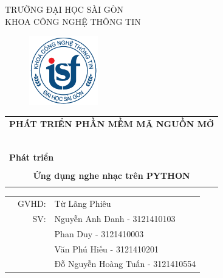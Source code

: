 \documentclass[a4paper]{article}
\begin{document}
\begin{titlepage}
	\begin{center}
		TRƯỜNG ĐẠI HỌC SÀI GÒN \\
		KHOA CÔNG NGHỆ THÔNG TIN
	\end{center}
	\vspace{1cm}

	\begin{figure}[h!]
		\begin{center}
			\includegraphics[width=3cm]{logoITSGU.png}
		\end{center}
	\end{figure}

	\vspace{1cm}


	\begin{center}
		\begin{tabular}{c}
			\multicolumn{1}{l}{\textbf{{\Large PHÁT TRIỂN PHẦN MỀM MÃ NGUỒN MỞ}}} \\
			~~                                                                    \\
			\hline
			\\
			\multicolumn{1}{l}{\textbf{{\Large Phát triển}}}                      \\
			\\

			\textbf{{\Huge Ứng dụng nghe nhạc trên PYTHON}}                       \\
			\\
			\hline
		\end{tabular}
	\end{center}

	\vspace{3cm}

	\begin{table}[h]
		\begin{tabular}{rrl}
			\hspace{5 cm} & GVHD: & Từ Lãng Phiêu                     \\
			              & SV:   & Nguyễn Anh Danh - 3121410103      \\
			              &       & Phan Duy - 3121410003             \\
			              &       & Văn Phú Hiếu - 3121410201         \\
			              &       & Đỗ Nguyễn Hoàng Tuấn - 3121410554 \\
		\end{tabular}
		\vspace{1.5 cm}
	\end{table}


\end{titlepage}
\end{document}
